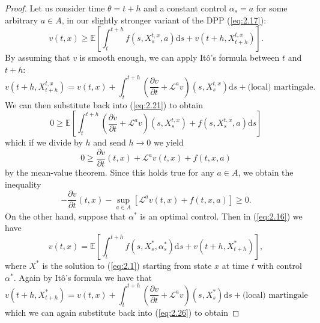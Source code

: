 \begin{proof}
    Let us consider time $\theta=t+h$ and a constant control $\alpha_s=a$ for some arbitrary
    $a\in A$, in our slightly stronger variant of the DPP (\ref{eq:2.17}):
    \begin{equation}\label{eq:2.21}
        v(t,x)\geq\mathbb{E}\left[\int_{t}^{t+h} f(s,X_s^{t,x},a)\mathrm ds+v(t+h,X_{t+h}^{t,x})\right].
    \end{equation}
    By assuming that $v$ is smooth enough, we can apply It\^{o}'s formula between
    $t$ and $t+h$:
    \begin{equation*}
        v(t+h,X_{t+h}^{t,x})=v(t,x)+\int_t^{t+h}\left(\frac{\partial v}{\partial t}+\mathcal{L}^av\right)(s,X_s^{t,x})\mathrm ds +\textrm{(local) martingale}.
    \end{equation*}
    We can then substitute back into (\ref{eq:2.21}) to obtain
    \begin{equation*}
        0\geq\mathbb{E}\left[\int_t^{t+h}\left(\frac{\partial v}{\partial t}+\mathcal{L}^av\right)(s,X_s^{t,x})+f(s,X_s^{t,x},a)\mathrm ds\right]
    \end{equation*}
    which if we divide by $h$ and send $h\rightarrow0$ we yield
    \begin{equation*}
        0\geq\frac{\partial v}{\partial t}(t,x)+\mathcal{L}^av(t,x)+f(t,x,a)
    \end{equation*}
    by the mean-value theorem. Since this holds true for any $a\in A$, we obtain the
    inequality
    \begin{equation}\label{eq:2.25}
        -\frac{\partial v}{\partial t}(t,x)-\sup_{a\in A}[\mathcal{L}^av(t,x)+f(t,x,a)]\geq0.
    \end{equation}
    On the other hand, suppose that $\alpha^*$ is an optimal control. Then in (\ref{eq:2.16})
    we have
    \begin{equation}\label{eq:2.26}
        v(t,x)=\mathbb{E}\left[\int_t^{t+h}f(s,X_s^*,\alpha_s^*)\mathrm ds+v(t+h,X_{t+h}^*)\right],
    \end{equation}
    where $X^*$ is the solution to (\ref{eq:2.1}) starting from state $x$ at time $t$
    with control $\alpha^*.$ Again by It\^{o}'s formula we have that 
    \begin{equation*}
        v(t+h,X^*_{t+h})=v(t,x)+\int_t^{t+h}\left(\frac{\partial v}{\partial t}+\mathcal{L}^av\right)(s,X_s^*)\mathrm ds +\textrm{(local) martingale}
    \end{equation*}
    which we can again substitute back into (\ref{eq:2.26}) to obtain

\end{proof}
